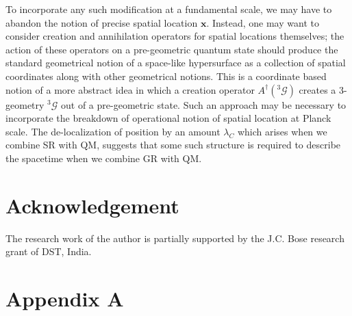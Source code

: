 \documentclass{article}
\begin{document}
To incorporate any such modification at a fundamental scale, we may have to abandon the notion of  precise spatial location $\bm{x}$. 
Instead, one may want to consider creation and annihilation operators for spatial locations themselves; the action of these operators on a pre-geometric quantum state should produce the standard geometrical notion of a space-like hypersurface as a collection of spatial coordinates along with other geometrical notions. This is a coordinate based notion of a more abstract idea in which a creation operator $A^\dagger({}^3\mathcal{G})$ creates a 3-geometry ${}^3\mathcal{G}$ out of a pre-geometric state. Such an approach may be necessary to incorporate the breakdown of operational notion of spatial location at Planck scale. The de-localization of position by an amount $\lambda_C$ which arises when we combine SR with QM, suggests that some such structure is required to describe the spacetime when we combine GR with QM. 



\section*{Acknowledgement}
The research work of the author is partially supported by the J.C. Bose research grant of DST, India.



\appendix

\section{Appendix A}
\label{sec:appencompo}
\end{document}

